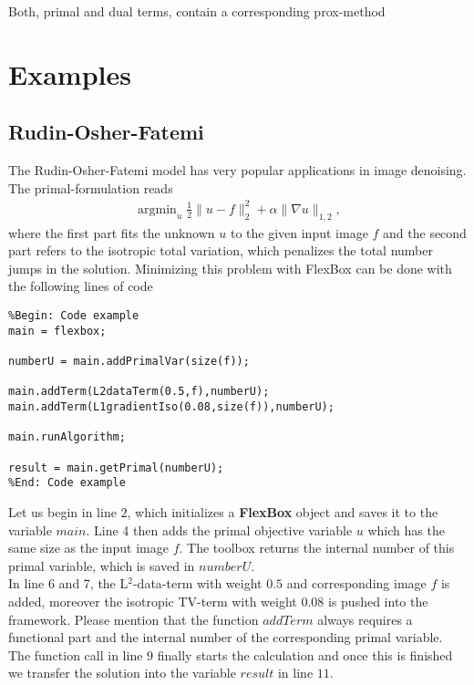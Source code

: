 \documentclass[final,leqno,onefignum,onetabnum]{article}
\newcommand{\1}[1]{\mathds{1}_{#1}}
\DeclareMathOperator*{\argmin}{\arg \min}%
\begin{document}
Both, primal and dual terms, contain a corresponding prox-method  

\section{Examples}

\subsection{Rudin-Osher-Fatemi}
The Rudin-Osher-Fatemi model  has very popular applications in image denoising. The primal-formulation reads
\begin{align}
	\argmin_u \frac{1}{2}\|u-f\|_2^2 + \alpha \|\nabla u\|_{1,2},
\end{align}
where the first part fits the unknown $u$ to the given input image $f$ and the second part refers to the isotropic total variation, which penalizes the total number jumps in the solution. Minimizing this problem with FlexBox can be done with the following lines of code

\begin{lstlisting} 
%Begin: Code example
main = flexbox;

numberU = main.addPrimalVar(size(f));

main.addTerm(L2dataTerm(0.5,f),numberU);
main.addTerm(L1gradientIso(0.08,size(f)),numberU);

main.runAlgorithm;

result = main.getPrimal(numberU);
%End: Code example
\end{lstlisting}
Let us begin in line $2$, which initializes a \textbf{FlexBox} object and saves it to the variable $main$. Line 4 then adds the primal objective variable $u$ which has the same size as the input image $f$. The toolbox returns the internal number of this primal variable, which is saved in $numberU$. \\
In line 6 and 7, the L$^2$-data-term with weight $0.5$ and corresponding image $f$ is added, moreover the isotropic TV-term with weight $0.08$ is pushed into the framework. Please mention that the function $addTerm$ always requires a functional part and the internal number of the corresponding primal variable. \\
The function call in line $9$ finally starts the calculation and once this is finished we transfer the solution into the variable $result$ in line $11$. 
\end{document}
